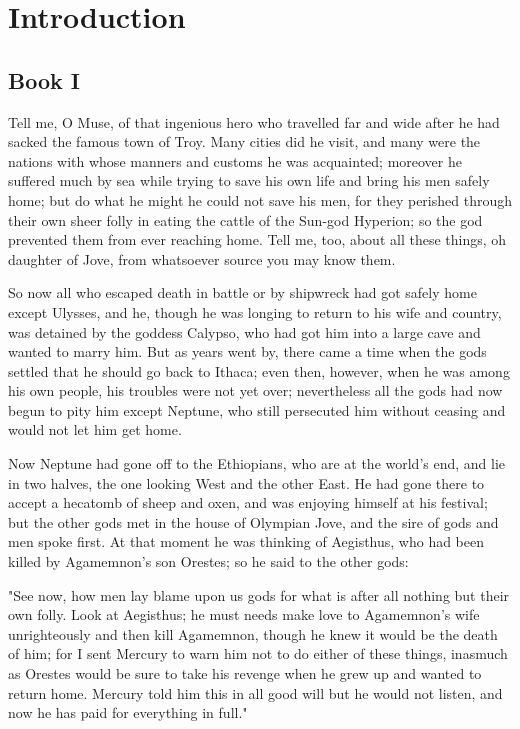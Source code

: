 \section{Introduction}

\subsection{Book I}

Tell me, O Muse, of that ingenious hero who travelled far and wide after he
had sacked the famous town of Troy. Many cities did he visit, and many were
the nations with whose manners and customs he was acquainted; moreover he
suffered much by sea while trying to save his own life and bring his men
safely home; but do what he might he could not save his men, for they perished
through their own sheer folly in eating the cattle of the Sun-god Hyperion; so
the god prevented them from ever reaching home. Tell me, too, about all these
things, oh daughter of Jove, from whatsoever source you may know them.

So now all who escaped death in battle or by shipwreck had got safely home
except Ulysses, and he, though he was longing to return to his wife and country,
 was detained by the goddess Calypso, who had got him into a large cave and
 wanted to marry him. But as years went by, there came a time when the gods
 settled that he should go back to Ithaca; even then, however, when he was
 among his own people, his troubles were not yet over; nevertheless all the
 gods had now begun to pity him except Neptune, who still persecuted him
 without ceasing and would not let him get home.

Now Neptune had gone off to the Ethiopians, who are at the world's end, and
lie in two halves, the one looking West and the other East. He had gone
there to accept a hecatomb of sheep and oxen, and was enjoying himself at
his festival; but the other gods met in the house of Olympian Jove, and the
sire of gods and men spoke first. At that moment he was thinking of Aegisthus,
who had been killed by Agamemnon's son Orestes; so he said to the other gods:

"See now, how men lay blame upon us gods for what is after all nothing but
their own folly. Look at Aegisthus; he must needs make love to Agamemnon's
wife unrighteously and then kill Agamemnon, though he knew it would be the
death of him; for I sent Mercury to warn him not to do either of these things,
inasmuch as Orestes would be sure to take his revenge when he grew up and
wanted to return home. Mercury told him this in all good will but he would not
listen, and now he has paid for everything in full."

